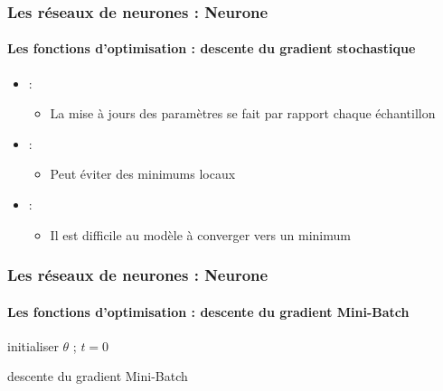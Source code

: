 \documentclass[xcolor=table]{beamer}
\begin{document}
\begin{frame}
\frametitle{Les réseaux de neurones : Neurone}
\framesubtitle{Les fonctions d'optimisation : descente du gradient stochastique}

\begin{itemize}
\item {} : 
\begin{itemize}
	\item La mise à jours des paramètres se fait par rapport chaque échantillon
\end{itemize}
\item {} : 
\begin{itemize}
	\item Peut éviter des minimums locaux
\end{itemize}
\item {} : 
\begin{itemize}
	\item Il est difficile au modèle à converger vers un minimum
\end{itemize}
\end{itemize}

\end{frame}


\begin{frame}
\frametitle{Les réseaux de neurones : Neurone}
\framesubtitle{Les fonctions d'optimisation : descente du gradient Mini-Batch}

\begin{algorithm}[H]
	\KwResult{$ \theta $}
	initialiser $ \theta $ ; $ t = 0 $\;
	\caption{descente du gradient Mini-Batch}
\end{algorithm}

\end{frame}
\end{document}
